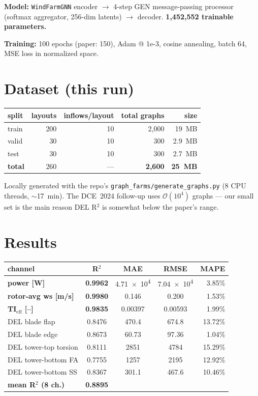 \documentclass[10pt,letterpaper]{article}
\begin{document}
\textbf{Model:} \texttt{WindFarmGNN} encoder $\to$ 4-step GEN message-passing processor (softmax aggregator, 256-dim latents) $\to$ decoder. \textbf{1{,}452{,}552 trainable parameters.}

\textbf{Training:} 100 epochs (paper: 150), Adam @ 1e-3, cosine annealing, batch 64, MSE loss in normalized space.

\section{Dataset (this run)}
\begin{center}
\begin{tabular}{lrrrr}
\toprule
split & layouts & inflows/layout & total graphs & size \\
\midrule
train & 200 & 10 & 2{,}000 & \SI{19}{MB} \\
valid & 30  & 10 & 300    & \SI{2.9}{MB} \\
test  & 30  & 10 & 300    & \SI{2.7}{MB} \\
\midrule
\textbf{total} & 260 & --- & \textbf{2{,}600} & \textbf{\SI{25}{MB}} \\
\bottomrule
\end{tabular}
\end{center}
Locally generated with the repo's \texttt{graph\_farms/generate\_graphs.py} (8 CPU threads, $\sim$17~min). The DCE~2024 follow-up uses $\mathcal{O}(10^4)$ graphs --- our small set is the main reason DEL R$^2$ is somewhat below the paper's range.

\section{Results}
\begin{center}
\begin{tabular}{lcccr}
\toprule
channel & R$^2$ & MAE & RMSE & MAPE \\
\midrule
\textbf{power [W]}                    & \textbf{0.9962} & \num{4.71e4}  & \num{7.04e4}  & 3.85\% \\
\textbf{rotor-avg ws [m/s]}           & \textbf{0.9980} & 0.146 & 0.200 & 1.53\% \\
\textbf{TI$_\mathrm{eff}$ [--]}        & \textbf{0.9835} & 0.00397 & 0.00593 & 1.99\% \\
DEL blade flap            & 0.8476 & 470.4 & 674.8 & 13.72\% \\
DEL blade edge            & 0.8673 & 60.73 & 97.36 & 1.04\% \\
DEL tower-top torsion     & 0.8111 & 2851 & 4784  & 15.29\% \\
DEL tower-bottom FA       & 0.7755 & 1257 & 2195  & 12.92\% \\
DEL tower-bottom SS       & 0.8367 & 301.1 & 467.6 & 10.46\% \\
\midrule
\textbf{mean R$^2$ (8 ch.)} & \textbf{0.8895} & & & \\
\bottomrule
\end{tabular}
\end{center}
\end{document}
